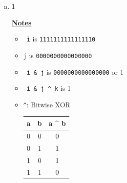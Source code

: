 \documentclass[12pt]{article}
\begin{document}
\begin{enumerate}[1.]
\begin{enumerate}[a)]

        \item 1

        \bigskip

        \underline{\textbf{Notes}}

        \begin{itemize}
            \item \texttt{~i} is \texttt{1111111111111110}
            \item \texttt{j} is \texttt{0000000000000000}
            \item \texttt{~i \& j} is \texttt{0000000000000000} or 1
            \item \texttt{~i \& j \^{} k} is 1
            \item \texttt{\^{}}: Bitwise XOR

            \bigskip

            \begin{center}
                \begin{tabular}{|c|c|c|}
                    \hline
                    a & b & a \^{} b\\
                    \hline
                    0 & 0  & 0 \\
                    0 & 1  & 1 \\
                    1 & 0  & 1 \\
                    1 & 1  & 0 \\
                    \hline
                \end{tabular}
            \end{center}

            \bigskip


\end{itemize}
\end{enumerate}
\end{enumerate}
\end{document}
